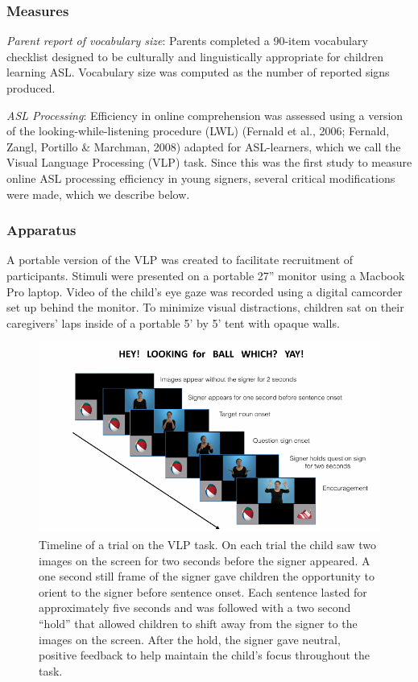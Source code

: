 \documentclass[12pt,]{article}
\begin{document}
\subsubsection{Measures}\label{measures}

\emph{Parent report of vocabulary size}: Parents completed a 90-item
vocabulary checklist designed to be culturally and linguistically
appropriate for children learning ASL. Vocabulary size was computed as
the number of reported signs produced.

\emph{ASL Processing}: Efficiency in online comprehension was assessed
using a version of the looking-while-listening procedure (LWL) (Fernald
et al., 2006; Fernald, Zangl, Portillo \& Marchman, 2008) adapted for
ASL-learners, which we call the Visual Language Processing (VLP) task.
Since this was the first study to measure online ASL processing
efficiency in young signers, several critical modifications were made,
which we describe below.

\subsubsection{Apparatus}\label{apparatus}

A portable version of the VLP was created to facilitate recruitment of
participants. Stimuli were presented on a portable 27'' monitor using a
Macbook Pro laptop. Video of the child's eye gaze was recorded using a
digital camcorder set up behind the monitor. To minimize visual
distractions, children sat on their caregivers' laps inside of a
portable 5' by 5' tent with opaque walls.

\begin{figure}[htbp]
\centering
\includegraphics{Figs/timeline-1.pdf}
\caption{Timeline of a trial on the VLP task. On each trial the child
saw two images on the screen for two seconds before the signer appeared.
A one second still frame of the signer gave children the opportunity to
orient to the signer before sentence onset. Each sentence lasted for
approximately five seconds and was followed with a two second ``hold''
that allowed children to shift away from the signer to the images on the
screen. After the hold, the signer gave neutral, positive feedback to
help maintain the child's focus throughout the task.}
\end{figure}
\end{document}
